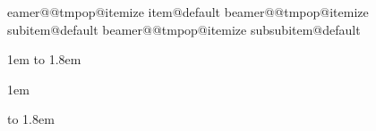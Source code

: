 %
\makeatletter
\expandafter\let\csname beamer@@tmpop@itemize item@default\endcsname\relax
\expandafter\let\csname beamer@@tmpop@itemize subitem@default\endcsname\relax
\expandafter\let\csname beamer@@tmpop@itemize subsubitem@default\endcsname\relax






\renewcommand{\itemize}[1][]{%
  \beamer@ifempty{#1}{}{\def\beamer@defaultospec{#1}}%
  \ifnum \@itemdepth >2\relax\@toodeep\else
    \advance\@itemdepth\@ne
    \beamer@computepref\@itemdepth%
    \usebeamerfont{itemize/enumerate \beameritemnestingprefix body}%
    \usebeamercolor[fg]{itemize/enumerate \beameritemnestingprefix body}%
    \usebeamertemplate{itemize/enumerate \beameritemnestingprefix body begin}%
    \list
      {\usebeamertemplate{itemize \beameritemnestingprefix item}}
      {\def\makelabel##1{%
          {%
            \hss\llap{{%
                \usebeamerfont*{itemize \beameritemnestingprefix item}%
                \usebeamercolor[fg]{itemize \beameritemnestingprefix item}##1}}%
          }%
        }%
      }
  \fi%
  \beamer@cramped%
  \raggedleft%
  \beamer@firstlineitemizeunskip%
}
\makeatother
\makeatletter
\bidi@undef\beamer@@tmpop@footnote@default

{
  \parindent 1em\noindent%
  \raggedleft
  \hbox to 1.8em{\hfil\insertfootnotemark}\insertfootnotetext\par%
}

{
  \parindent 1em\noindent%
  \raggedright
  \hbox to 1.8em{\hfil\insertfootnotemark}\latinfont\insertfootnotetext\par%
}
\footdir@temp\footdir@ORG@bidi@beamer@framefootnotetext{}
\let\@footnotetext=\beamer@framefootnotetext
\let\@RTLfootnotetext\@footnotetext

